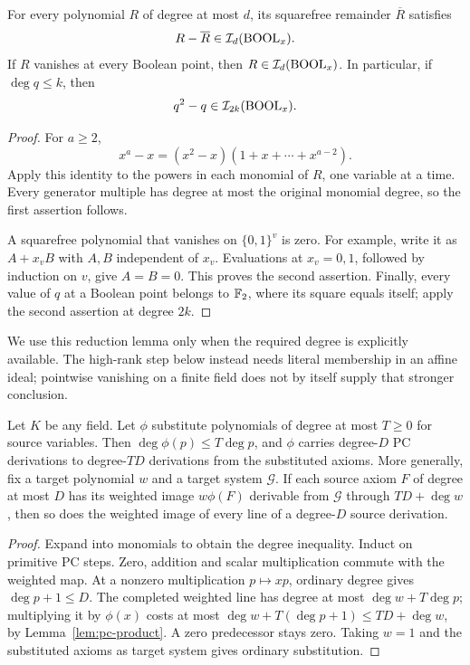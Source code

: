 \begin{lemma}\label{lem:boolean}
For every polynomial \(R\) of degree at most \(d\), its squarefree
remainder \(\overline R\) satisfies
\[
 R-\overline R\in\mathcal I_d(\operatorname{BOOL}_x).
\]
If \(R\) vanishes at every Boolean point, then
\(R\in\mathcal I_d(\operatorname{BOOL}_x)\). In particular, if \(\deg q\le k\), then
\[
 q^2-q\in\mathcal I_{2k}(\operatorname{BOOL}_x).
\]
\end{lemma}
\begin{proof}
For \(a\ge2\),
\[
 x^a-x=(x^2-x)(1+x+\cdots+x^{a-2}).
\]
Apply this identity to the powers in each monomial of \(R\), one variable
at a time. Every generator multiple has degree at most the original
monomial degree, so the first assertion follows.

A squarefree polynomial that vanishes on \(\{0,1\}^v\) is zero.
For example, write it as \(A+x_vB\) with \(A,B\) independent of \(x_v\).
Evaluations at \(x_v=0,1\), followed by induction on \(v\), give \(A=B=0\).
This proves the second assertion. Finally, every value of \(q\) at a
Boolean point belongs to \(\mathbb F_2\), where its square equals itself; apply the
second assertion at degree \(2k\).
\end{proof}

We use this reduction lemma only when the required degree is explicitly
available. The high-rank step below instead needs literal membership in
an affine ideal; pointwise vanishing on a finite field does not by itself
supply that stronger conclusion.


\begin{lemma}\label{lem:substitution}
Let \(K\) be any field. Let \(\phi\) substitute polynomials of degree at most
\(T\ge0\) for source variables. Then \(\deg\phi(p)\le T\deg p\), and
\(\phi\) carries degree-\(D\) PC derivations to degree-\(TD\) derivations
from the substituted axioms. More generally, fix a target polynomial \(w\)
and a target system \(\mathcal G\). If each source axiom \(F\) of degree
at most \(D\) has its weighted image \(w\phi(F)\) derivable from
\(\mathcal G\) through \(TD+\deg w\), then so does the weighted image
of every line of a degree-\(D\) source derivation.
\end{lemma}
\begin{proof}
Expand into monomials to obtain the degree inequality. Induct on primitive
PC steps. Zero, addition and scalar multiplication commute with the weighted
map. At a nonzero multiplication \(p\mapsto xp\), ordinary degree gives
\(\deg p+1\le D\). The completed weighted line has degree at most
\(\deg w+T\deg p\); multiplying it by \(\phi(x)\) costs at most
\(\deg w+T(\deg p+1)\le TD+\deg w\), by
Lemma~\ref{lem:pc-product}. A zero predecessor stays zero. Taking \(w=1\)
and the substituted axioms as target system gives ordinary substitution.
\end{proof}

